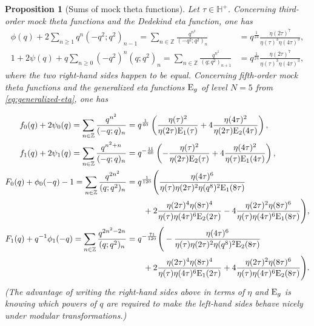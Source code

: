 \documentclass[reqno,11pt]{amsart}
\newtheorem{proposition}[theorem]{Proposition}
\theoremstyle{definition}
\theoremstyle{remark}
\numberwithin{equation}{section}
\newcommand{\Z}{\mathbb{Z}}
\renewcommand{\H}{{\mathbb{H}}}
\newcommand{\E}{\textnormal E}
\begin{document}
\begin{proposition}[Sums of mock theta functions] \label{prop:mock-theta-sums}
Let $\tau \in \H^+$. Concerning third-order mock theta functions and the Dedekind eta function, one has
\[
\begin{aligned}
    \phi(q)
    + 2\sum_{n \ge 1} q^n \left(-q^2; q^2\right)_{n-1}
    = \sum_{n \in \Z} \frac{q^{n^2}}{\left(-q^2; q^2\right)_n} &= 
    q^{\frac{1}{24}} \frac{\eta(2\tau)^7}{\eta(\tau)^3 \eta(4\tau)^3},
    \\
    1 + 2\psi(q) + q\sum_{n \ge 0} \left(-q^2\right)^n\left(q; q^2\right)_n = \sum_{n \in \Z} \frac{q^{n^2}}{\left(q; q^2\right)_{n+1}} &= 
    q^{\frac{1}{24}}\frac{\eta(2\tau)^7}{\eta(\tau)^3\eta(4\tau)^3},
\end{aligned}
\] 
where the two right-hand sides happen to be equal. Concerning fifth-order mock theta functions and the generalized eta functions $\E_g$ of level $N = 5$ from \cref{eq:generalized-eta}, one has

\[
\begin{aligned}
    f_0(q) + 2\psi_0(q) = \sum_{n \in \Z} \frac{q^{n^2}}{(-q; q)_n} &=
    q^{\frac{1}{60}} \left(\frac{\eta(\tau)^2}{\eta(2\tau)\E_1(\tau)} + 4\frac{\eta(4\tau)^2}{\eta(2\tau) \E_2(4\tau)} \right),
    \\
    f_1(q) + 2\psi_1(q) = \sum_{n \in \Z} \frac{q^{n^2+n}}{(-q; q)_n} &= 
    q^{-\frac{11}{60}} \left(-\frac{\eta(\tau)^2}{\eta(2\tau)\E_2(\tau)} + 4\frac{\eta(4\tau)^2}{\eta(\tau) \E_1(4\tau)} \right),
    \\
    F_0(q) + \phi_0(-q) - 1 = 
    \sum_{n \in \Z} \frac{q^{2n^2}}{(q; q^2)_n} &= 
    q^{\frac{1}{120}}
    \Bigg( 
    \frac{\eta(4\tau)^6}
    {\eta(\tau) \eta(2\tau)^2 \eta(q^8)^2 \E_1(8\tau)}
    \\
    &\qquad
    +
    2\frac{\eta(2\tau)^4 \eta(8\tau)^4}
    {\eta(\tau) \eta(4\tau)^6 \E_2(2\tau)}
    -
    4\frac{\eta(2\tau)^2 \eta(8\tau)^6}
    {\eta(\tau) \eta(4\tau)^6 \E_1(8\tau)}
    \Bigg),
    \\
    F_1(q) + q^{-1} \phi_1(-q) = 
    \sum_{n \in \Z} \frac{q^{2n^2-2n}}{(q; q^2)_n}
    &=
    q^{-\frac{71}{120}}
    \Bigg(-\frac{\eta(4\tau)^6}
    {\eta(\tau) \eta(2\tau)^2 \eta(q^8)^2 \E_2(8\tau)}
    \\
    &\qquad
    +
    2\frac{\eta(2\tau)^4 \eta(8\tau)^4}
    {\eta(\tau) \eta(4\tau)^6 \E_1(2\tau)}
    +
    4\frac{\eta(2\tau)^2 \eta(8\tau)^6}
    {\eta(\tau) \eta(4\tau)^6 \E_2(8\tau)}
    \Bigg).
\end{aligned}
\]
(The advantage of writing the right-hand sides above in terms of $\eta$ and $\E_g$ is knowing which powers of $q$ are required to make the left-hand sides behave nicely under modular transformations.)
\end{proposition}
\end{document}
